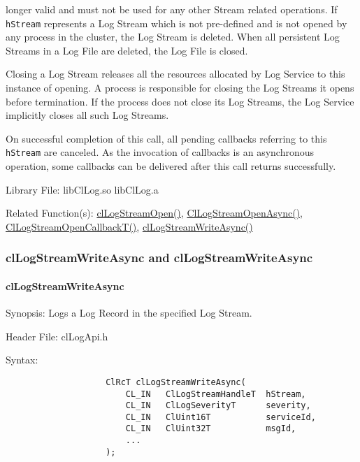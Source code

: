 \begin{flushleft}
\begin{Desc}
longer valid and must not be used for any other Stream related operations. If {\tt{hStream}} represents a Log Stream which is not pre-defined and 
is not opened by any process in the cluster, the Log Stream is deleted. When all persistent Log Streams in a Log File are deleted, the Log File is closed.
\par
Closing a Log Stream releases all the resources allocated by Log Service to this instance of opening. A process is responsible for closing the Log Streams 
it opens before termination. If the process does not close its Log Streams, the Log Service implicitly closes all such Log Streams.
\par
On successful completion of this call, all pending callbacks referring to this {\tt{hStream}} are canceled. As the invocation of callbacks is an 
asynchronous operation, some callbacks can be delivered after this call returns successfully.
\end{Desc}
\begin{Desc}
\item[Library File:] 
libClLog.so
\newline
libClLog.a
\end{Desc}
\begin{Desc}
\item[Related Function(s):]\hyperlink{pagelog106}{clLogStreamOpen()}, \hyperlink{pagelog106}{ClLogStreamOpenAsync()}, 
\hyperlink{pagelog107}{ClLogStreamOpenCallbackT()}, \hyperlink{pagelog109}{clLogStreamWriteAsync()}
\end{Desc}
\newpage



\subsubsection{clLogStreamWriteAsync and clLogStreamWriteAsync}
\hypertarget{pagelog109}{}\paragraph{cl\-Log\-Stream\-Write\-Async}\label{pagelog109}
\begin{Desc}
\item[Synopsis:] Logs a Log Record in the specified Log Stream.\end{Desc}
\begin{Desc}
\item[Header File:] clLogApi.h \end{Desc}
\begin{Desc}
\item[Syntax:]
\footnotesize\begin{verbatim}        	
					ClRcT clLogStreamWriteAsync(
						CL_IN	ClLogStreamHandleT	hStream, 
						CL_IN	ClLogSeverityT		severity,
						CL_IN	ClUint16T			serviceId,
						CL_IN	ClUint32T			msgId,
						...
					);
					

\end{verbatim}
\end{Desc}
\end{flushleft}

